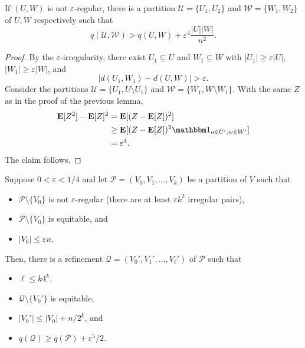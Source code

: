 			\begin{lemma}
				\label{lemma: szemeredi lemma energy increases for irregular}
				If $(U,W)$ is not $\varepsilon$-regular, there is a partition $\mathcal{U} = \{U_1,U_2\}$ and $\mathcal{W} = \{W_1,W_2\}$ of $U,W$ respectively such that
				\[ q(\mathcal{U},\mathcal{W}) > q(U,W) + \varepsilon^4 \frac{|U||W|}{n^2}. \]
			\end{lemma}
			\begin{proof}
				By the $\varepsilon$-irregularity, there exist $U_1\subseteq U$ and $W_1\subseteq W$ with $|U_1| \ge \varepsilon|U|$, $|W_1| \ge \varepsilon|W|$, and
				\[ |d(U_1,W_1) - d(U,W)| > \varepsilon. \]
				Consider the partitions $\mathcal{U} = \{U_1,U\setminus U_1\}$ and $\mathcal{W} = \{W_1,W\setminus W_1\}$. With the same $Z$ as in the proof of the previous lemma,
				\begin{align*}
					\expec[Z^2] - \expec[Z]^2 &= \expec[(Z - \expec[Z])^2] \\
						&\ge \expec[(Z - \expec[Z])^2 \indic_{u\in U', w\in W'}] \\
						&= \varepsilon^4.
				\end{align*}
				The claim follows.
			\end{proof}

			\begin{flem}
				\label{lemma: final step of szemeredi's regularity lemma}
				Suppose $0 < \varepsilon < 1/4$ and let $\mathcal{P} = (V_0,V_1,\ldots,V_k)$ be a partition of $V$ such that
				\begin{itemize}
				 	\item $\mathcal{P} \setminus \{V_0\}$ is not $\varepsilon$-regular (there are at least $\varepsilon k^2$ irregular pairs),
				 	\item $\mathcal{P} \setminus \{V_0\}$ is equitable\footnotemark, and
				 	\item $|V_0| \le \varepsilon n$.
				\end{itemize}
				Then, there is a refinement $\mathcal{Q} = (V_0',V_1',\ldots,V_\ell')$ of $\mathcal{P}$ such that
				\begin{itemize}
					\item $\ell \le k 4^k$,
					\item $\mathcal{Q} \setminus \{V_0'\}$ is equitable,
					\item $|V_0'| \le |V_0| + n / 2^k$, and
					\item $q(\mathcal{Q}) \ge q(\mathcal{P}) + \varepsilon^5/2$.
				\end{itemize}
			\end{flem}

